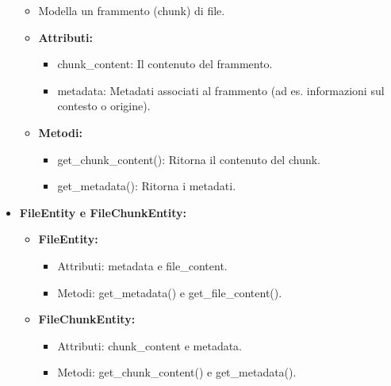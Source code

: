 \begin{itemize}
        \begin{itemize}
            \item Modella un frammento (chunk) di file.
            \item \textbf{Attributi:}
            \begin{itemize}
                \item chunk\_content: Il contenuto del frammento.
                \item metadata: Metadati associati al frammento (ad es. informazioni sul contesto o origine).
            \end{itemize}
            \item \textbf{Metodi:}
            \begin{itemize}
                \item get\_chunk\_content(): Ritorna il contenuto del chunk.
                \item get\_metadata(): Ritorna i metadati.
            \end{itemize}
        \end{itemize}
        \item \textbf{FileEntity e FileChunkEntity:}
        \begin{itemize}
            \item \textbf{FileEntity:}
            \begin{itemize}
                \item Attributi: metadata e file\_content.
                \item Metodi: get\_metadata() e get\_file\_content().
            \end{itemize}
            \item \textbf{FileChunkEntity:}
            \begin{itemize}
                \item Attributi: chunk\_content e metadata.
                \item Metodi: get\_chunk\_content() e get\_metadata().
            \end{itemize}
        \end{itemize}
    \end{itemize}

